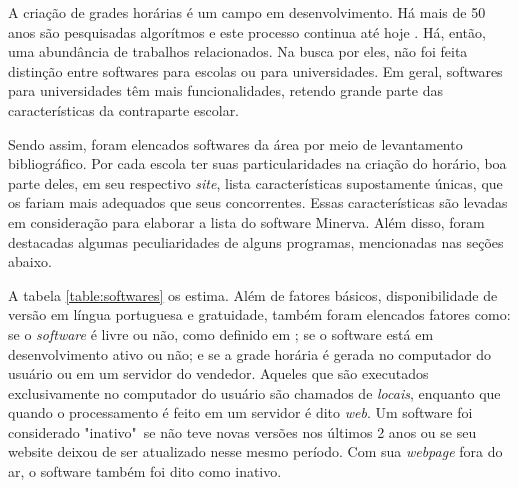 \documentclass{subfiles}
\begin{document}
\par A criação de grades horárias é um campo em desenvolvimento. Há mais de 50 anos são pesquisadas algorítmos \cite{appleby} e este processo continua até hoje \cite{patat2020}. Há, então, uma abundância de trabalhos relacionados. Na busca por eles, não foi feita distinção entre softwares para escolas ou para universidades. Em geral, softwares para universidades têm mais funcionalidades, retendo grande parte das características da contraparte escolar.

\par Sendo assim, foram elencados softwares da área por meio de levantamento bibliográfico. Por cada escola ter suas particularidades na criação do horário, boa parte deles, em seu respectivo \textit{site}, lista características supostamente únicas, que os fariam mais adequados que seus concorrentes. Essas características são levadas em consideração para elaborar a lista do software Minerva. Além disso, foram destacadas algumas peculiaridades de alguns programas, mencionadas nas seções abaixo.

\par A tabela \ref{table:softwares} os estima. Além de fatores básicos, disponibilidade de versão em língua portuguesa e gratuidade, também foram elencados fatores como: se o \textit{software} é livre ou não, como definido em \cite{publico}; se o software está em desenvolvimento ativo ou não; e se a grade horária é gerada no computador do usuário ou em um servidor do vendedor. Aqueles que são executados exclusivamente no computador do usuário são chamados de \textit{locais}, enquanto que quando o processamento é feito em um servidor é dito \textit{web}. Um software foi considerado "inativo"\, se não teve novas versões nos últimos 2 anos ou se seu website deixou de ser atualizado nesse mesmo período. Com sua \textit{webpage} fora do ar, o software também foi dito como inativo.
\end{document}
